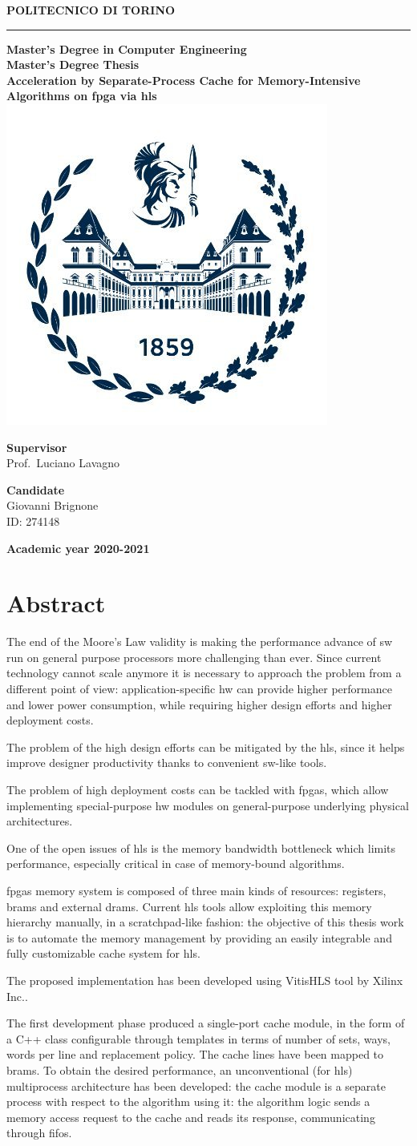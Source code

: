 \documentclass[11pt,a4paper,oneside]{memoir}
\renewcommand*{\maketitle}%
{
	\newgeometry{left=2cm,right=2cm,top=3cm,bottom=3.5cm}

	\begin{center}
		\begingroup
		{\Huge\textbf{POLITECNICO DI TORINO}}\\[\baselineskip]
		\rule{\textwidth}{2pt}\par
		\vspace*{1em}
		{\LARGE\textbf{Master's Degree in Computer Engineering}}\\[\baselineskip]
		\vspace*{1em}
		{\Large\textbf{Master's Degree Thesis}}\\
		\vspace*{2cm}
		{\huge\textbf{Acceleration by Separate-Process Cache for
		Memory-Intensive Algorithms on \acs{fpga} via \acl{hls}}}\\
		\vspace*{1cm}
		\includegraphics[width=.3\textwidth]{figures/polito-logo}
	\end{center}
	\vfill
	\begin{minipage}{0.4\textwidth}
		\begin{flushleft}
			{\Large
				\textbf{Supervisor}\\
				Prof.\ Luciano Lavagno
			}
		\end{flushleft}
	\end{minipage}
	\begin{minipage}{0.4\textwidth}
		\begin{flushright} 
			{\Large
				\textbf{Candidate}\\
				Giovanni Brignone\\
				ID: 274148
			}
		\end{flushright}
	\end{minipage}  
	\vspace*{2cm}
	\begin{center}
		{\Large\textbf{Academic year 2020-2021}}
	\end{center}
	\endgroup

	\restoregeometry 
}
\begin{document}
\pagestyle{empty}
\maketitle

\clearpage
\pagestyle{plain}

\frontmatter
\chapter*{Abstract}
The end of the Moore's Law validity is making the performance advance of
\acl{sw} run on general purpose processors more challenging than ever.
Since current technology cannot scale anymore it is necessary to approach the
problem from a different point of view: application-specific \acl{hw} can
provide higher performance and lower power consumption, while requiring higher
design efforts and higher deployment costs.

The problem of the high design efforts can be mitigated by the \acf{hls}, since
it helps improve designer productivity thanks to convenient \acl{sw}-like
tools.

The problem of high deployment costs can be tackled with \acp{fpga}, which allow
implementing special-purpose \acl{hw} modules on general-purpose underlying
physical architectures.

\bigskip
One of the open issues of \ac{hls} is the memory bandwidth bottleneck which
limits performance, especially critical in case of memory-bound algorithms.

\acp{fpga} memory system is composed of three main kinds of resources: registers,
\acp{bram} and external \acp{dram}.
Current \ac{hls} tools allow exploiting this memory hierarchy manually, in a
scratchpad-like fashion: the objective of this thesis work is to automate the
memory management by providing an easily integrable and fully customizable cache
system for \ac{hls}.

\bigskip
The proposed implementation has been developed using Vitis\texttrademark HLS
tool by Xilinx Inc..

The first development phase produced a single-port cache module, in the form of
a C++ class configurable through templates in terms of number of sets, ways,
words per line and replacement policy.
The cache lines have been mapped to \acp{bram}.
To obtain the desired performance, an unconventional (for \ac{hls}) multiprocess
architecture has been developed: the cache module is a separate process with
respect to the algorithm using it: the algorithm logic sends a memory access
request to the cache and reads its response, communicating through \acsp{fifo}.
\end{document}
